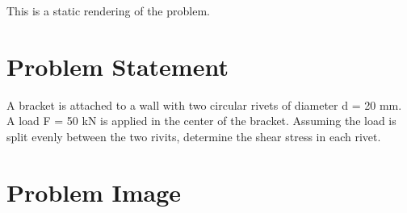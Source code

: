 \documentclass[
  letterpaper,
  DIV=11,
  numbers=noendperiod]{scrreprt}
\begin{document}

This is a static rendering of the problem.

\section*{Problem Statement}\label{problem-statement-8}


A bracket is attached to a wall with two circular rivets of diameter d =
20 mm. A load F = 50 kN is applied in the center of the bracket.
Assuming the load is split evenly between the two rivits, determine the
shear stress in each rivet.

\section*{Problem Image}\label{problem-image-18}

\end{document}
